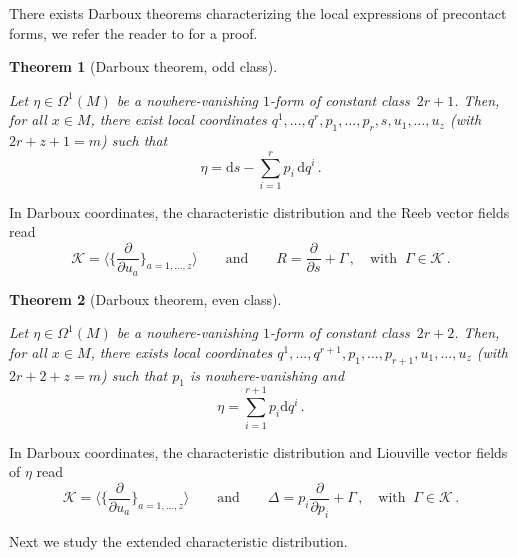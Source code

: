 \documentclass[11pt,twoside]{article}
\theoremstyle{plain}
\newtheorem{theorem}{Theorem}[section]
\theoremstyle{definition}
\renewcommand{\d}{\mathrm{d}}
\newcommand{\parder}[2]{\frac{\partial #1}{\partial #2}}
\def\d{\mathrm{d}}
\newcommand{\fracp}[2]{\frac{\partial #1}{\partial #2}}
\def\d{\mathrm{d}}
\def\K{\mathcal{K}}
\begin{document}
There exists Darboux theorems characterizing the local expressions of precontact forms, we refer the reader to \cite{god_1969,LM_1987} for a proof.
\begin{theorem}[Darboux theorem, odd class]\,

\noindent Let $\eta \in \Omega^1(M)$ be a nowhere-vanishing $1$-form of constant class~$2r+1$. 
    Then, for all $x\in M$, there exist local coordinates 
    $q^1,\dotsc,q^r,p_1,\dotsc,p_r,s,u_1,\dotsc,u_z$ 
    (with $2r+z+1=m$) 
    such that
    \begin{equation}
    \label{pc_darboux_odd}
        \eta = \d s - \sum ^{r}_{i=1} p_i \,\d q^i \,.
    \end{equation}
\end{theorem}
    
In Darboux coordinates, 
the characteristic distribution and
the Reeb vector fields read
$$
\K = \bigg\langle \bigg\{ \fracp{}{u_a} \bigg\}_{a=1,\dotsc,z} \bigg\rangle\qquad\text{and}\qquad R = \fracp{}{s} +\Gamma\,,\quad \text{with }\ \Gamma \in \K\,.
$$

\begin{theorem}[Darboux theorem, even class]\,

\noindent Let $\eta \in \Omega^1(M)$ be a nowhere-vanishing $1$-form of constant class~$2r+2$. 
    Then, for all $x\in M$, there exists local coordinates $q^1,\dotsc,q^{r+1},p_1,\dotsc,p_{r+1},u_1,\dotsc,u_{
    z}$ (with $2r+2+z=m$) such that $p_1$ is nowhere-vanishing and
    $$
    \eta =\sum ^{r+1}_{i=1}p_i \d q^i \,.
    $$
\end{theorem}

In Darboux coordinates, the characteristic distribution and Liouville vector fields of $\eta$ read
$$ 
\K = \bigg\langle \bigg\{ \fracp{}{u_a} \bigg\}_{a=1,\dotsc,z} \bigg\rangle\qquad\text{and}\qquad \Delta = p_i\parder{}{p_i} + \Gamma\,,\quad  \text{with }\ \Gamma\in\K\,.
$$

Next we study the extended characteristic distribution.
\end{document}
